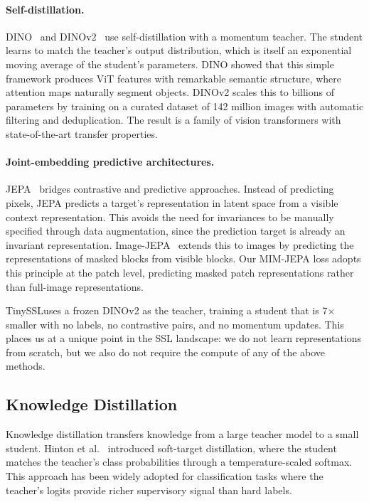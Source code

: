 \documentclass{article}
\newcommand{\method}{TinySSL}
\begin{document}
\paragraph{Self-distillation.} DINO~\cite{dino} and DINOv2~\cite{dino2} use self-distillation with a momentum teacher. The student learns to match the teacher's output distribution, which is itself an exponential moving average of the student's parameters. DINO showed that this simple framework produces ViT features with remarkable semantic structure, where attention maps naturally segment objects. DINOv2 scales this to billions of parameters by training on a curated dataset of 142 million images with automatic filtering and deduplication. The result is a family of vision transformers with state-of-the-art transfer properties.

\paragraph{Joint-embedding predictive architectures.} JEPA~\cite{jepa} bridges contrastive and predictive approaches. Instead of predicting pixels, JEPA predicts a target's representation in latent space from a visible context representation. This avoids the need for invariances to be manually specified through data augmentation, since the prediction target is already an invariant representation. Image-JEPA~\cite{imagejepa} extends this to images by predicting the representations of masked blocks from visible blocks. Our MIM-JEPA loss adopts this principle at the patch level, predicting masked patch representations rather than full-image representations.

\method uses a frozen DINOv2 as the teacher, training a student that is 7$\times$ smaller with no labels, no contrastive pairs, and no momentum updates. This places us at a unique point in the SSL landscape: we do not learn representations from scratch, but we also do not require the compute of any of the above methods.

\subsection{Knowledge Distillation}

Knowledge distillation transfers knowledge from a large teacher model to a small student. Hinton et al.~\cite{hinton} introduced soft-target distillation, where the student matches the teacher's class probabilities through a temperature-scaled softmax. This approach has been widely adopted for classification tasks where the teacher's logits provide richer supervisory signal than hard labels.
\end{document}
